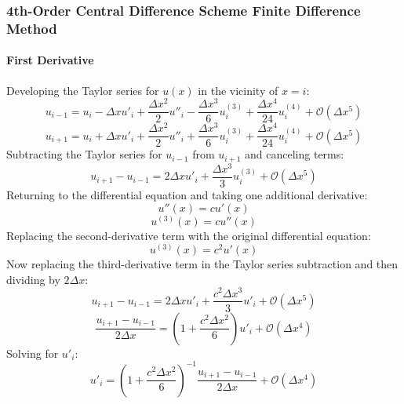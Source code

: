 \documentclass[10pt]{article}		%
\numberwithin{equation}{section}
\begin{document}
\subsubsection{4th-Order Central Difference Scheme Finite Difference Method}

\paragraph{First Derivative}
Developing the Taylor series for $u(x)$ in the vicinity of $x = i$:
\begin{equation}
u_{i-1} = u_i - \Delta x u'_i + \frac{\Delta x^2}{2} u''_i - \frac{\Delta x^3}{6} u^{(3)}_i + \frac{\Delta x^4}{24} u^{(4)}_i + \mathcal{O}(\Delta x^5)
\end{equation}
\begin{equation}
u_{i+1} = u_i + \Delta x u'_i + \frac{\Delta x^2}{2} u''_i + \frac{\Delta x^3}{6} u^{(3)}_i + \frac{\Delta x^4}{24} u^{(4)}_i + \mathcal{O}(\Delta x^5)
\end{equation}
Subtracting the Taylor series for $u_{i-1}$ from $u_{i+1}$ and canceling terms:
\begin{equation}
u_{i+1} - u_{i-1} = 2\Delta xu'_i + \frac{\Delta x^3}{3} u^{(3)}_i + \mathcal{O}(\Delta x^5)
\end{equation}
Returning to the differential equation and taking one additional derivative:
\begin{equation}
u''(x)=cu'(x)
\end{equation}
\begin{equation}
u^{(3)}(x)=cu''(x)
\end{equation}
Replacing the second-derivative term with the original differential equation:
\begin{equation}
u^{(3)}(x) = c^2u'(x)
\end{equation}
Now replacing the third-derivative term in the Taylor series subtraction and then dividing by $2\Delta x$:
\begin{equation}
u_{i+1} - u_{i-1} = 2\Delta xu'_i + \frac{c^2\Delta x^3}{3}u'_i  + \mathcal{O}(\Delta x^5)
\end{equation}
\begin{equation}
\frac{u_{i+1} - u_{i-1}}{2\Delta x} = \left(1 + \frac{c^2\Delta x^2}{6}\right)u'_i  + \mathcal{O}(\Delta x^4)
\end{equation}
Solving for $u'_i$:
\begin{equation}
u'_i = \left(1 + \frac{c^2\Delta x^2}{6}\right)^{-1} \frac{u_{i+1} - u_{i-1}}{2\Delta x} + \mathcal{O}(\Delta x^4)
\end{equation}
\end{document}
